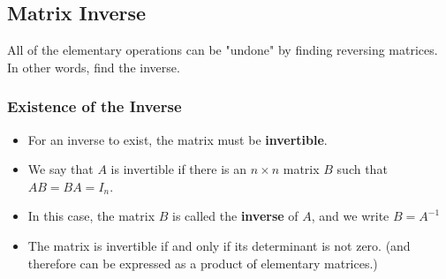 \documentclass[10pt]{article}
\begin{document}
\subsection*{Matrix Inverse}
All of the elementary operations can be "undone" by finding reversing matrices.  In other words, find the inverse.

\subsubsection*{Existence of the Inverse}
\begin{itemize}
	\item For an inverse to exist, the matrix must be \textbf{invertible}.
	\item We say that $A$ is invertible if there is an $n \times n$ matrix $B$ such that $AB = BA = I_n$.
	\item In this case, the matrix $B$ is called the \textbf{inverse} of $A$, and we write $B = A^{-1}$
	\item The matrix is invertible if and only if its determinant is not zero. (and therefore can be expressed as a product of elementary matrices.)
\end{itemize}
\end{document}
